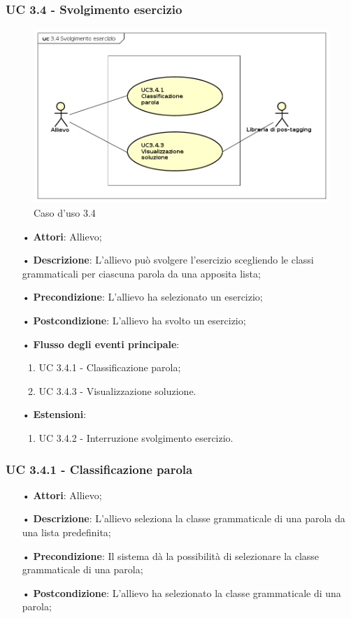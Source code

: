 \subsubsection{UC 3.4 - Svolgimento esercizio}
\begin{figure}[H]
\centering
\includegraphics[width=17cm]{img/UC34.png} 
\caption{Caso d'uso 3.4}\label{fig:34}
\end{figure}
\begin{itemize}
\item[•]\textbf{Attori}: Allievo;
\item[•]\textbf{Descrizione}: L’allievo può svolgere l’esercizio scegliendo le classi grammaticali per ciascuna parola da una apposita lista;
\item[•]\textbf{Precondizione}: L’allievo ha selezionato un esercizio;
\item[•]\textbf{Postcondizione}: L’allievo ha svolto un esercizio;
\item[•]\textbf{Flusso degli eventi principale}:
\begin{enumerate}
\item UC 3.4.1 - Classificazione parola;
\item UC 3.4.3 - Visualizzazione soluzione.
\end{enumerate}
\item[•]\textbf{Estensioni}:
\begin{enumerate}
\item UC 3.4.2 - Interruzione svolgimento esercizio.
\end{enumerate}
\end{itemize}

\subsubsection{UC 3.4.1 - Classificazione parola}
\begin{itemize}
\item[•]\textbf{Attori}: Allievo;
\item[•]\textbf{Descrizione}: L’allievo seleziona la classe grammaticale di una parola da una lista predefinita;
\item[•]\textbf{Precondizione}: Il sistema dà la possibilità di selezionare la classe grammaticale di una parola;
\item[•]\textbf{Postcondizione}: L’allievo ha selezionato la classe grammaticale di una parola;
\end{itemize}

